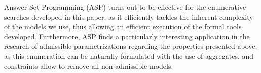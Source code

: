 Answer Set Programming (ASP) \cite{Baral03} turns out to be effective for the enumerative searches developed in this paper,
as it efficiently tackles the inherent complexity of the models we use, thus allowing an efficient execution of the formal tools developed.
Furthermore, ASP finds a particularly interesting application in the research of admissible parametrizations regarding the properties presented above, as this enumeration can be naturally formulated with the use of aggregates, and constraints allow to remove all non-admissible models.
